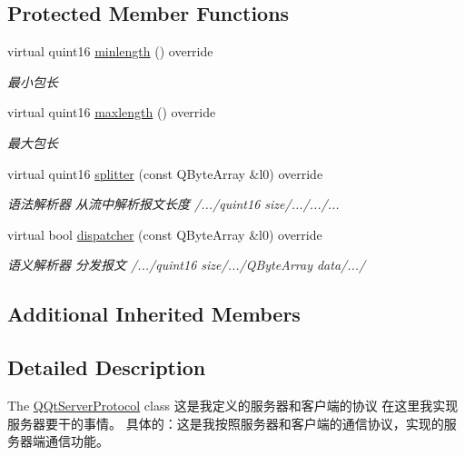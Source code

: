 \subsection*{Protected Member Functions}
\begin{DoxyCompactItemize}
\item 
virtual quint16 \mbox{\hyperlink{class_q_qt_server_protocol_aedf7e04e6c47c20e0e76f9e99a60a524}{minlength}} () override
\begin{DoxyCompactList}\small\item\em 最小包长 \end{DoxyCompactList}\item 
virtual quint16 \mbox{\hyperlink{class_q_qt_server_protocol_ac4822c4cab54e3c909683857f7e60e16}{maxlength}} () override
\begin{DoxyCompactList}\small\item\em 最大包长 \end{DoxyCompactList}\item 
virtual quint16 \mbox{\hyperlink{class_q_qt_server_protocol_ad32e1371ad050b5db9ce135b8fc5d96e}{splitter}} (const Q\+Byte\+Array \&l0) override
\begin{DoxyCompactList}\small\item\em 语法解析器 从流中解析报文长度 /.../quint16 size/.../.../... \end{DoxyCompactList}\item 
virtual bool \mbox{\hyperlink{class_q_qt_server_protocol_a5649fe79c03f11076a4c3014c8013c25}{dispatcher}} (const Q\+Byte\+Array \&l0) override
\begin{DoxyCompactList}\small\item\em 语义解析器 分发报文 /.../quint16 size/.../\+Q\+Byte\+Array data/.../ \end{DoxyCompactList}\end{DoxyCompactItemize}
\subsection*{Additional Inherited Members}


\subsection{Detailed Description}
The \mbox{\hyperlink{class_q_qt_server_protocol}{Q\+Qt\+Server\+Protocol}} class 这是我定义的服务器和客户端的协议 在这里我实现服务器要干的事情。 具体的：这是我按照服务器和客户端的通信协议，实现的服务器端通信功能。 

